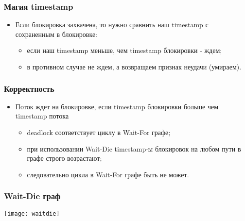 \begin{frame}
\frametitle{Магия timestamp}
\begin{itemize}
    \item<1->Если блокировка захвачена, то нужно сравнить наш timestamp с
         сохраненным в блокировке:
    \begin{itemize}
        \item<2->если наш timestamp меньше, чем timestamp блокировки - ждем;
        \item<3->в противном случае не ждем, а возвращаем признак неудачи
             (умираем).
    \end{itemize}
\end{itemize}
\end{frame}

\begin{frame}
\frametitle{Корректность}
\begin{itemize}
    \item<1->Поток ждет на блокировке, если timestamp блокировки больше
         чем timestamp потока
    \begin{itemize}
        \item<2->deadlock соответствует циклу в Wait-For графе;
        \item<3->при использовании Wait-Die timestamp-ы блокировок на любом
             пути в графе строго возрастают;
        \item<4->следовательно цикла в Wait-For графе быть не может.
    \end{itemize}
\end{itemize}
\end{frame}

\begin{frame}
\frametitle{Wait-Die граф}
\texttt{[image: waitdie]}
\end{frame}

